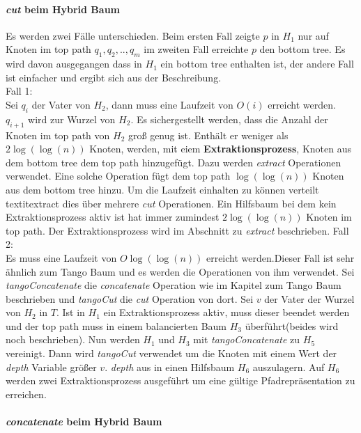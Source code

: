 \documentclass[a4paper,12pt]{article}
\begin{document}
\paragraph{\textit{cut} beim Hybrid Baum}
Es werden zwei Fälle unterschieden. Beim ersten Fall zeigte $p$ in $H_1$ nur auf Knoten im top path $q_1,q_2,..,q_m$ im zweiten Fall erreichte $p$ den bottom tree. Es wird davon ausgegangen dass in $H_1$ ein bottom tree enthalten ist, der andere Fall ist einfacher und ergibt sich aus der Beschreibung.\\
Fall 1:\\
Sei $q_i$ der Vater von $H_2$, dann muss eine Laufzeit von $O\left(i\right)$ erreicht werden. $q_{i+1}$ wird zur Wurzel von $H_2$. Es sichergestellt werden, dass die Anzahl der Knoten im top path von $H_2$ groß genug ist. Enthält er weniger als $2 \log\left(\log\left(n\right)\right)$ Knoten, werden, mit eiem \textbf{Extraktionsprozess}, Knoten aus dem bottom tree dem top path hinzugefügt. Dazu werden \textit{extract} Operationen verwendet. Eine solche Operation fügt dem top path $\log\left(\log\left(n\right)\right)$ Knoten aus dem bottom tree hinzu. Um die Laufzeit einhalten zu können verteilt textit{extract} dies über mehrere \textit{cut} Operationen. Ein Hilfsbaum bei dem kein Extraktionsprozess aktiv ist hat immer zumindest  $2 \log\left(\log\left(n\right)\right)$ Knoten im top path. Der Extraktionsprozess wird im Abschnitt zu \textit{extract} beschrieben.  
Fall 2:\\
Es muss eine Laufzeit von $O\log\left(\log\left(n\right)\right)$ erreicht werden.Dieser Fall ist sehr ähnlich zum Tango Baum und es werden die Operationen von ihm verwendet. Sei \textit{tangoConcatenate} die \textit{concatenate} Operation wie im Kapitel zum Tango Baum beschrieben und \textit{tangoCut} die \textit{cut} Operation von dort. Sei $v$ der Vater der Wurzel von $H_2$ in $T$. Ist in $H_1$ ein Extraktionsprozess aktiv, muss dieser beendet werden und der top path muss in einem balancierten Baum $H_3$ überführt(beides wird noch beschrieben). Nun werden $H_1$ und $H_3$ mit \textit{tangoConcatenate}  zu $H_5$ vereinigt. Dann wird \textit{tangoCut} verwendet um die Knoten mit einem Wert der \textit{depth} Variable größer $v.$ \textit{depth} aus in einen Hilfsbaum $H_6$ auszulagern. Auf $H_6$ werden zwei Extraktionsprozess ausgeführt um eine gültige Pfadrepräsentation zu erreichen.   

\paragraph{\textit{concatenate} beim Hybrid Baum}
\end{document}
